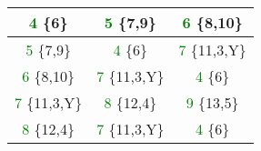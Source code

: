 \begin{itemize}
\begin{table}[H]
\begin{tabular}{|c|c|c|}
			\textcolor{green}{4} \{6\} & \textcolor{green}{5} \{7,9\} &
			\textcolor{green}{6} \{8,10\} \\\hline
			
			\textcolor{green}{5} \{7,9\} & \textcolor{green}{4} \{6\} &
			\textcolor{green}{7} \{11,3,Y\} \\\hline
			
			\textcolor{green}{6} \{8,10\} & \textcolor{green}{7} \{11,3,Y\} &
			\textcolor{green}{4} \{6\} \\\hline
			
			\textcolor{green}{7} \{11,3,Y\} & \textcolor{green}{8} \{12,4\} &
			\textcolor{green}{9} \{13,5\} \\\hline
			
			\textcolor{green}{8} \{12,4\} & \textcolor{green}{7} \{11,3,Y\} &
			\textcolor{green}{4} \{6\} \\\hline
			

\end{tabular}
\end{table}
\end{itemize}
